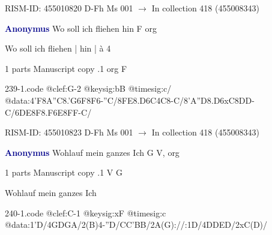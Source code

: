 \documentclass[twocolumn]{book}
\begin{document}
\newline RISM-ID: 455010820
\newline D-Fh  Ms 001
\newline $\rightarrow$ In collection 418 (455008343)

\newline \par \vspace{7pt} \textcolor{darkblue}{\textbf{Anonymus  }}
\newline Wo soll ich fliehen hin  F  
\newline org
\newline \begin{itshape}[f.13v, at left:] Wo soll ich fliehen | hin | à 4\end{itshape} 
\newline \textcolor{darkblue}{}  1 parts  
\newline Manuscript copy
.1  org  F  
\begin{filecontents*}{239-1.code}
@clef:G-2
@keysig:bB
@timesig:c/
@data:4'F{8A''C}{8.'G6F}8F6-''C/{8FE8.D6C}4C8-C/{8'A''D8.D6xC}{8DD}-C/{6DE8F8.F6E}{8FF}-C/
\end{filecontents*}
\newline
%

\newline RISM-ID: 455010823
\newline D-Fh  Ms 001
\newline $\rightarrow$ In collection 418 (455008343)

\newline \par \vspace{7pt} \textcolor{darkblue}{\textbf{Anonymus  }}
\newline Wohlauf mein ganzes Ich  G  
\newline V, org
\newline \begin{itshape}\end{itshape} 
\newline \textcolor{darkblue}{}  1 parts  
\newline Manuscript copy
.1  V  G
\newline \begin{footnotesize} Wohlauf mein ganzes Ich \end{footnotesize}  
\begin{filecontents*}{240-1.code}
@clef:C-1
@keysig:xF
@timesig:c
@data:1'D/4GDGA/2(B)4-''D/CC'BB/2A(G)://:1D/4DDED/2xC(D)/
\end{filecontents*}
\newline
%
\end{document}
